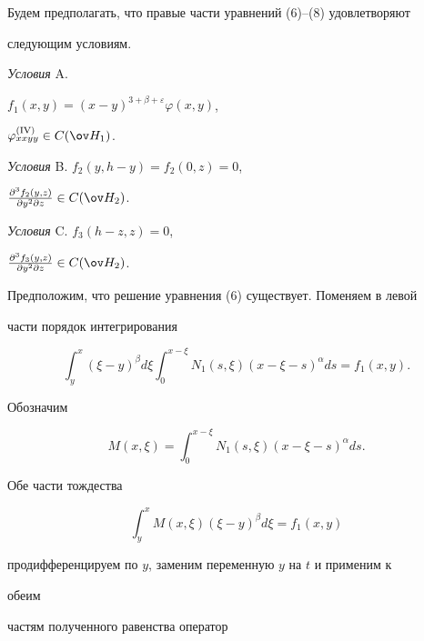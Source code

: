 Будем предполагать, что правые части уравнений (6)--(8) удовлетворяют 


следующим условиям. 


 


{\it Условия} A. 


$f_1(x,y)=(x-y)^{3+\beta+\varepsilon}\varphi(x,y)$, 


$\varphi^{(\mathrm{IV})}_{xxyy}\in C(\ov H_1)$. 


 


{\it Условия} B. $f_2(y,h-y)=f_2(0,z)=0$, 


$\frac{\partial^3f_2(y,z)}{\partial y^2\partial z} 


\in C(\ov H_2)$. 


 


{\it Условия} C. $f_3(h-z,z)=0$, 


$\frac{\partial^3f_3(y,z)}{\partial y^2\partial z}


\in C(\ov H_2)$. 


 


Предположим, что решение уравнения (6) существует. Поменяем в левой 


части порядок интегрирования 


$$ 


\int^x_y(\xi-y)^\beta d\xi\int^{x-\xi}_0 N_1(s,\xi) 


(x-\xi-s)^\alpha ds=f_1(x,y). 


$$ 


Обозначим 


\begin{equation} 


M(x,\xi)=\int^{x-\xi}_0 N_1(s,\xi) 


(x-\xi-s)^\alpha ds. 


\end{equation} 


Обе части тождества 


\begin{equation} 


\int^x_y M(x,\xi)(\xi-y)^\beta d\xi=f_1(x,y) 


\end{equation} 


продифференцируем по $y$, заменим переменную $y$ на $t$ и применим к 


обеим 


частям полученного равенства оператор 


